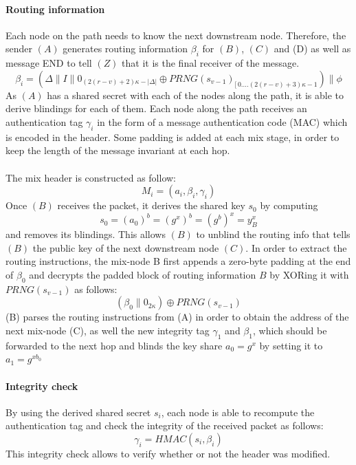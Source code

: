 \paragraph{Routing information}
Each node on the path needs to know the next downstream node. Therefore, the sender $(A)$ generates routing information $\beta_i$ for $(B)$, $(C)$ and (D) as well as message END to tell $(Z)$ that it is the final receiver of the message.
$$\beta_i=(\Delta\|I\|0_{(2(r-v)+2)\kappa-|\Delta|}\oplus PRNG(s_{v-1})_{[ \,0....(2(r-v)+3)\kappa-1})\|\phi$$
\newline As $(A)$ has a shared secret with each of the nodes along the path, it is able to derive blindings for each of them. 
\newline Each node along the path receives an authentication tag $\gamma_i$ in the form of a message authentication code (MAC)
which is encoded in the header.
\newline Some padding is added at each mix stage, in order to keep the length of the message invariant at each hop. 
\\~\\The mix header is constructed as follow: $$M_i=(a_i,\beta_i,\gamma_i)$$ 
\newline Once $(B)$ receives the packet, it derives the shared key $s_0$ by computing $$s_0=(a_0)^b=(g^x)^b=(g^b)^x=y^x_B$$ and removes its blindings. This allows $(B)$ to unblind the routing info that tells $(B)$ the public key of the next downstream node $(C)$. In order to extract the routing instructions, the mix-node B first appends a zero-byte padding at the end of $\beta_0$ and decrypts the padded block of routing information $B$ by XORing it with $PRNG(s_{v-1})$ as follows:
$$(\beta_0\|0_{2\kappa})\oplus PRNG(s_{v-1})$$
(B) parses the routing instructions from (A) in order to obtain the address of the next mix-node (C), as well the new integrity tag $\gamma_1$ and $\beta_1$, which should be forwarded to the next hop and blinds the key share $a_0=g^x$ by setting it to $a_1=g^{xb_0}$
\paragraph{Integrity check}
By using the derived shared secret $s_i$, each node is able to recompute the authentication tag and check the integrity of the received packet as follows: $$\gamma_i=HMAC(s_i,\beta_i)$$
This integrity check allows to verify whether or not the header was modified.

